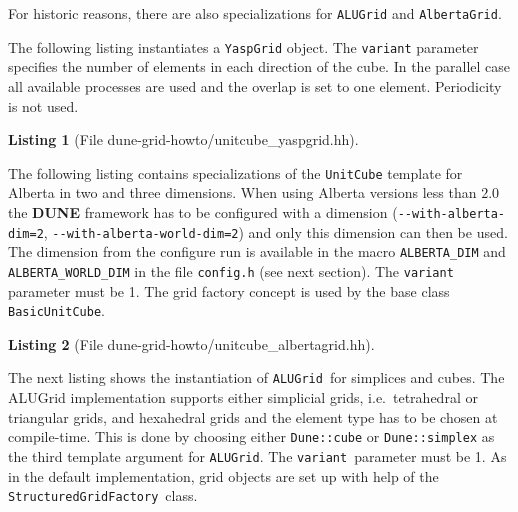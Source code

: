 \documentclass[11pt,a4paper,headinclude,footinclude,DIV16,headings=normal]{scrreprt}
\newcommand{\Dune}{{\sffamily\bfseries DUNE}\xspace}
\newtheorem{lst}{Listing}
\begin{document}
For historic reasons, there are also specializations for
\lstinline!ALUGrid! and \lstinline!AlbertaGrid!.


The following listing instantiates a \lstinline!YaspGrid! object. The
\lstinline!variant! parameter specifies the number of elements in each
direction of the cube. In the parallel case all available processes
are used and the overlap is set to one element. Periodicity is not
used.

\begin{lst}[File dune-grid-howto/unitcube\_yaspgrid.hh] \mbox{}
\nopagebreak

\end{lst}


The following listing contains specializations of the
\lstinline!UnitCube! template for Alberta in two and three
dimensions. When using Alberta versions less than $2.0$ the \Dune{} framework
has to be configured with a dimension (\lstinline!--with-alberta-dim=2!,
\lstinline!--with-alberta-world-dim=2!) and only this dimension can then be
used.
The dimension from the configure run is available in the macro
\lstinline!ALBERTA_DIM! and \lstinline!ALBERTA_WORLD_DIM!
in the file \lstinline!config.h! (see
next section). The \lstinline!variant! parameter must be 1.
The grid factory concept is used by the base class \lstinline!BasicUnitCube!.

\begin{lst}[File dune-grid-howto/unitcube\_albertagrid.hh] \mbox{}
\nopagebreak

\end{lst}


The next listing shows the instantiation of \lstinline!ALUGrid!\ for
simplices and cubes.
The ALUGrid implementation supports either simplicial grids, i.e.\
tetrahedral or triangular grids, and hexahedral grids and the
element type has to be chosen at compile-time. This is done by choosing
either \lstinline!Dune::cube! or \lstinline!Dune::simplex! as the third
template argument for \lstinline!ALUGrid!.
The \lstinline!variant!\ parameter must be 1.
As in the default implementation, grid objects are set up with help of the
\lstinline!StructuredGridFactory!\ class.
\end{document}
